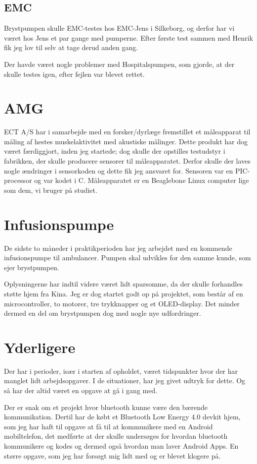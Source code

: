\subsection{EMC}

Brystpumpen skulle EMC-testes hos EMC-Jens i Silkeborg, og derfor har vi været hos Jens et par gange med pumperne. Efter første test sammen med Henrik fik jeg lov til selv at tage derud anden gang.

Der havde været nogle problemer med Hospitalspumpen, som gjorde, at der skulle testes igen, efter fejlen var blevet rettet.

\section{AMG}

ECT A/S har i samarbejde med en forsker/dyrlæge fremstillet et måleapparat til måling af hestes muskelaktivitet med akustiske målinger. Dette produkt har dog været færdiggjort, inden jeg startede; dog skulle der opstilles testudstyr i fabrikken, der skulle producere sensorer til måleapparatet. Derfor skulle der laves nogle ændringer i sensorkoden og dette fik jeg ansvaret for. Sensoren var en PIC-processor og var kodet i C. Måleapparatet er en Beaglebone Linux computer lige som dem, vi bruger på studiet. 

\section{Infusionspumpe}

De sidste to måneder i praktikperioden har jeg arbejdet med en kommende infusionspumpe til ambulancer. Pumpen skal udvikles for den samme kunde, som ejer brystpumpen.

Oplysningerne har indtil videre været lidt sparsomme, da der skulle forhandles støtte hjem fra Kina. Jeg er dog startet godt op på projektet, som består af en microcontroller, to motorer, tre trykknapper og et OLED-display. Det minder dermed en del om brystpumpen dog med nogle nye udfordringer.

\section{Yderligere}

Der har i perioder, især i starten af opholdet, været tidspunkter hvor der har manglet lidt arbejdsopgaver. I de situationer, har jeg givet udtryk for dette. Og så har der altid været en opgave at gå i gang med.

Der er snak om et projekt hvor bluetooth kunne være den bærende kommunikation. Dertil har de købt et Bluetooth Low Energy 4.0 devkit hjem, som jeg har haft til opgave at få til at kommunikere med en Android mobiltelefon, det medførte at der skulle undersøges for hvordan bluetooth kommunikere og kodes og dermed også hvordan man laver Android Apps. En større opgave, som jeg har forsøgt mig lidt med og er blevet klogere på.